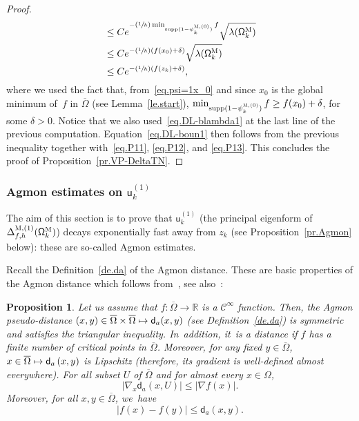 \documentclass[JEP,XML,SOM,Unicode,NoEqCountersInSection,NoFloatCountersInSection,published]{cedram}
\newcommand{\Psfrac}[2]{(\sfrac{#1}{#2})}
\newcommand\mto{\mathchoice{\longmapsto}{\mapsto}{\mapsto}{\mapsto}}
\theoremstyle{plain}
\newtheorem{proposition}{Proposition}
\theoremstyle{definition}
\begin{document}
\begin{proof}
\begin{align*}
&\le Ce^{-\Psfrac 1h \min_{\text{supp}(1- \psi^{\textsc{M},(0)}_k)} f} \sqrt{\lambda(\mathsf \Omega_k^{\textsc{M}}) }\\
&\le Ce^{-\Psfrac 1h (f(x_0)+\delta)} \sqrt{\lambda(\mathsf \Omega_k^{\textsc{M}}) }\\
&\le Ce^{-\Psfrac 1h (f(z_k)+\delta)},
\end{align*}
where we used the fact that, from~\eqref{eq.psi=1x_0} and since $x_0$ is the global minimum of~$f$ in $\overline \Omega$ (see Lemma~\ref{le.start}), $\min_{\text{supp}(1- \psi^{\textsc{M},(0)}_k)} f\ge f(x_0)+\delta$, for some $\delta>0$. Notice that we also used~\eqref{eq.DL-blambda1} at the last line of the previous computation.
Equation~\eqref{eq.DL-boun1} then follows from the previous inequality together with~\eqref{eq.P11}, \eqref{eq.P12}, and \eqref{eq.P13}.
This concludes the proof of Proposition~\ref{pr.VP-DeltaTN}.
\end{proof}

\subsubsection{Agmon estimates on $\mathsf u^{(1)}_k$}\label{sec.Agmon1}

The aim of this section is to prove that $\mathsf u^{(1)}_k$ (the
principal eigenform of $ \Delta_{f,h}^{\textsc{M},(1)} (\mathsf \Omega_k^{\textsc{M}}) $) decays
exponentially fast away from $z_k$ (see Proposition~\ref{pr.Agmon} below): these are so-called Agmon
estimates.

Recall the Definition~\ref{de.da} of the Agmon distance. These are basic properties of the Agmon distance which follows from~\cite[App.\,2]{helffer-sjostrand-85}, see also~\cite[Lem.\,3.2]{LeNi}:

\begin{proposition}
\label{pr.p-agmon}
Let us assume that $f:\overline \Omega\to \mathbb R$ is a $\mathcal C^\infty$ function. Then, the Agmon pseudo-distance $(x,y)\in \overline \Omega \times\overline \Omega \mto \mathsf d_a(x,y)$ (see Definition~\ref{de.da}) is symmetric and satisfies the triangular inequality. In~addition, it~is a distance if $f$ has a finite number of critical points in $\overline \Omega$.
Moreover, for any fixed $y \in \overline \Omega$, $x \in \overline \Omega\mto
\mathsf d_a\left(x,y\right)$ is Lipschitz (therefore, its gradient is well-defined almost everywhere). For all subset $U$ of $\overline \Omega$ and for almost every $x \in \Omega$,
\begin{equation} \label{eq.eqq}
\vert \nabla_x \mathsf d_a\left(x,U\right) \vert \leq \vert \nabla f (x) \vert.
\end{equation}
Moreover, for all $x,y \in \overline \Omega$, we~have
\begin{equation} \label{eq.ineq}
\vert f(x)-f(y)\vert \leq \mathsf d_a(x,y).
\end{equation}
\end{proposition}
\end{document}
